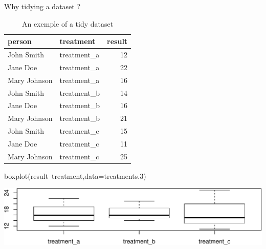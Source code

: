 \documentclass[14pt,ignorenonframetext,]{bredelebeamer}
\newenvironment{Shaded}{\begin{snugshade}}{\end{snugshade}}
\newcommand{\KeywordTok}[1]{\textcolor[rgb]{0.94,0.87,0.69}{#1}}
\newcommand{\DataTypeTok}[1]{\textcolor[rgb]{0.87,0.87,0.75}{#1}}
\newcommand{\DecValTok}[1]{\textcolor[rgb]{0.86,0.86,0.80}{#1}}
\newcommand{\OperatorTok}[1]{\textcolor[rgb]{0.94,0.94,0.82}{#1}}
\newcommand{\NormalTok}[1]{\textcolor[rgb]{0.80,0.80,0.80}{#1}}
\begin{document}
\begin{frame}[fragile]{Why tidying a dataset ?}

\begin{center}
\begin{table}[t]

\caption{\label{tab:unnamed-chunk-5}An exemple of a tidy dataset}
\centering
\begin{tabular}{l|l|r}
\hline
person & treatment & result\\
\hline
John Smith & treatment\_a & 12\\
\hline
Jane Doe & treatment\_a & 22\\
\hline
Mary Johnson & treatment\_a & 16\\
\hline
John Smith & treatment\_b & 14\\
\hline
Jane Doe & treatment\_b & 16\\
\hline
Mary Johnson & treatment\_b & 21\\
\hline
John Smith & treatment\_c & 15\\
\hline
Jane Doe & treatment\_c & 11\\
\hline
Mary Johnson & treatment\_c & 25\\
\hline
\end{tabular}
\end{table}
\end{center}

\begin{Shaded}
\begin{Highlighting}[]
\KeywordTok{boxplot}\NormalTok{(result}\OperatorTok{~}\NormalTok{treatment,}\DataTypeTok{data=}\NormalTok{treatments.}\DecValTok{3}\NormalTok{)}
\end{Highlighting}
\end{Shaded}

\includegraphics{tidyverse_28_03_files/figure-beamer/boxplot3-1.pdf}

\end{frame}
\end{document}
